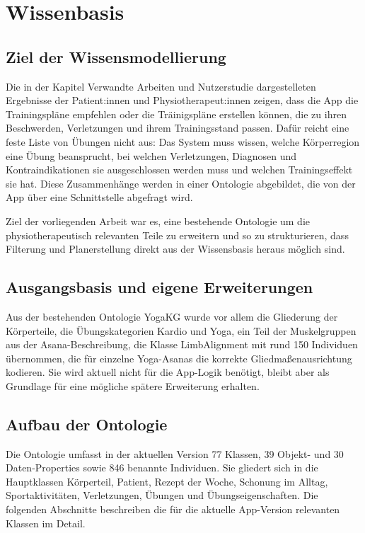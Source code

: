 \section{Wissenbasis}
\subsection{Ziel der Wissensmodellierung}

Die in der Kapitel Verwandte Arbeiten und Nutzerstudie dargestelleten Ergebnisse der Patient:innen und
Physiotherapeut:innen zeigen, dass die App die Trainingspläne empfehlen oder
die Träinigspläne erstellen können, die zu ihren Beschwerden, Verletzungen und
ihrem Trainingsstand passen. Dafür reicht eine feste Liste von Übungen nicht
aus: Das System muss wissen, welche Körperregion eine Übung beansprucht, bei
welchen Verletzungen, Diagnosen und Kontraindikationen sie ausgeschlossen
werden muss und welchen Trainingseffekt sie hat. Diese Zusammenhänge werden in
einer Ontologie abgebildet, die von der App über eine Schnittstelle abgefragt
wird.

Ziel der vorliegenden Arbeit war
es, eine bestehende Ontologie um die physiotherapeutisch relevanten Teile zu
erweitern und so zu strukturieren, dass Filterung und Planerstellung direkt aus
der Wissensbasis heraus möglich sind.

\subsection{Ausgangsbasis und eigene Erweiterungen}

Aus der bestehenden Ontologie
YogaKG wurde vor allem die Gliederung der Körperteile, die Übungskategorien Kardio und Yoga, ein Teil der Muskelgruppen aus der Asana-Beschreibung, die Klasse LimbAlignment mit rund 150 Individuen übernommen, die für einzelne Yoga-Asanas die korrekte Gliedmaßenausrichtung kodieren. Sie wird aktuell nicht für die App-Logik benötigt, bleibt aber als Grundlage für eine mögliche spätere Erweiterung erhalten.

\subsection{Aufbau der Ontologie}

Die Ontologie umfasst in der aktuellen Version 77 Klassen, 39 Objekt- und 30 Daten-Properties sowie 846 benannte Individuen. Sie gliedert sich in die Hauptklassen Körperteil, Patient, Rezept der Woche, Schonung im Alltag, Sportaktivitäten, Verletzungen, Übungen und Übungseigenschaften. Die folgenden
Abschnitte beschreiben die für die aktuelle App-Version relevanten Klassen im Detail.

